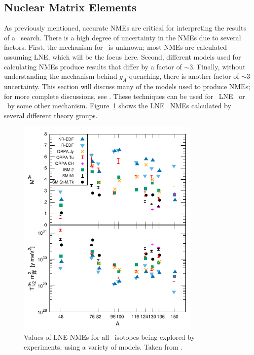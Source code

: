 \documentclass[/main.tex]{subfiles}
\begin{document}
\subsection{Nuclear Matrix Elements} \label{sec:NMEmethods}
As previously mentioned, accurate NMEs are critical for interpreting the results of a \znbb\ search.
There is a high degree of uncertainty in the NMEs due to several factors.
First, the mechanism for \znbb\ is unknown; most NMEs are calculated assuming LNE, which will be the focus here.
Second, different models used for calculating NMEs produce results that differ by a factor of ${\sim}3$.
Finally, without understanding the mechanism behind $g_A$ quenching, there is another factor of ${\sim}3$ uncertainty.
This section will discuss many of the models used to produce NMEs; for more complete discussions, see \cite{Avignone2008, Engel2017}.
These techniques can be used for \tnbb\, LNE \znbb\ or \znbb\ by some other mechanism.
Figure~\ref{fig:horribleplot} shows the LNE \znbb\ NMEs calculated by several different theory groups.
\begin{figure}[p]
  \centering
  \includegraphics[width=0.8\textwidth]{horribleplot}
  \caption[\znbb\ Nuclear Matrix Element Calculations]{\label{fig:horribleplot}
    Values of LNE NMEs for all \znbb\ isotopes being explored by experiments, using a variety of models. Taken from \cite{Engel2017}.
  }
\end{figure}
\end{document}
